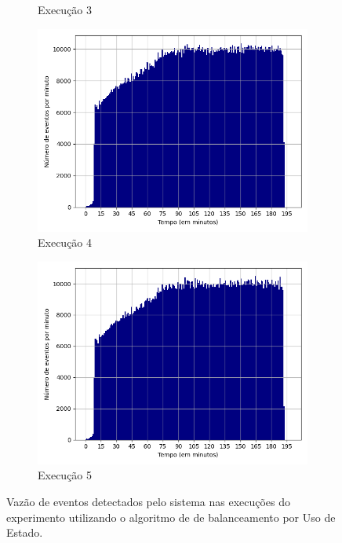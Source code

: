 \begin{figure}[h!]
\begin{subfigure}{.5\textwidth}
  \caption{Execução 3}
  \label{fig:histv-8-dez-su}
\end{subfigure}
\begin{subfigure}{.5\textwidth}
  \centering
  \includegraphics[width=.8\linewidth]{figuras/graphics/histogram_vazao_9-dez-su.png}  
  \caption{Execução 4}
  \label{fig:histv-9-dez-su}
\end{subfigure}
\begin{subfigure}{.5\textwidth}
  \centering
  \includegraphics[width=.8\linewidth]{figuras/graphics/histogram_vazao_10-dez-su.png}  
  \caption{Execução 5}
  \label{fig:histv-10-dez-su}
\end{subfigure}
\caption{Vazão de eventos detectados pelo sistema nas  execuções do experimento utilizando o algoritmo de de balanceamento por Uso de Estado.}
\label{fig:histogram_full_SU}
\end{figure}

